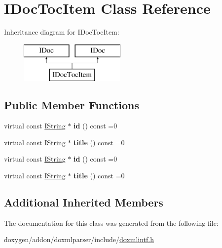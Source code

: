 \hypertarget{class_i_doc_toc_item}{}\section{I\+Doc\+Toc\+Item Class Reference}
\label{class_i_doc_toc_item}
Inheritance diagram for I\+Doc\+Toc\+Item\+:\begin{figure}[H]
\begin{center}
\leavevmode
\includegraphics[height=2.000000cm]{class_i_doc_toc_item}
\end{center}
\end{figure}
\subsection*{Public Member Functions}
\begin{DoxyCompactItemize}
\item 
\mbox{\label{class_i_doc_toc_item_a017dd14fd0329ff073ce9e4ba0af6424}} 
virtual const \mbox{\hyperlink{class_i_string}{I\+String}} $\ast$ {\bfseries id} () const =0
\item 
\mbox{\label{class_i_doc_toc_item_ad3361278731f04147aecdda93d8bae2e}} 
virtual const \mbox{\hyperlink{class_i_string}{I\+String}} $\ast$ {\bfseries title} () const =0
\item 
\mbox{\label{class_i_doc_toc_item_a017dd14fd0329ff073ce9e4ba0af6424}} 
virtual const \mbox{\hyperlink{class_i_string}{I\+String}} $\ast$ {\bfseries id} () const =0
\item 
\mbox{\label{class_i_doc_toc_item_ad3361278731f04147aecdda93d8bae2e}} 
virtual const \mbox{\hyperlink{class_i_string}{I\+String}} $\ast$ {\bfseries title} () const =0
\end{DoxyCompactItemize}
\subsection*{Additional Inherited Members}


The documentation for this class was generated from the following file\+:\begin{DoxyCompactItemize}
\item 
doxygen/addon/doxmlparser/include/\mbox{\hyperlink{include_2doxmlintf_8h}{doxmlintf.\+h}}\end{DoxyCompactItemize}
